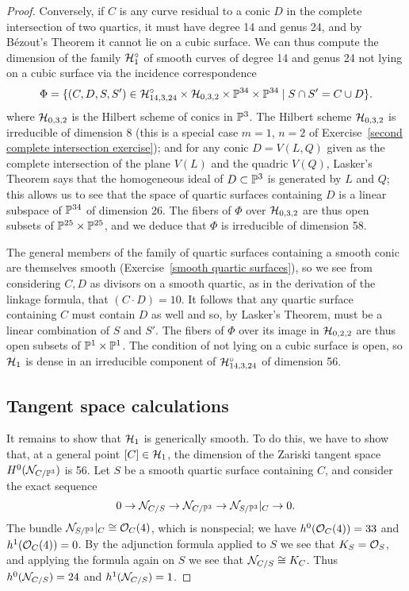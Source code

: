 \begin{proof}
Conversely, if $C$ is any curve residual to a conic $D$ in the complete intersection of two quartics, it must have degree 14 and genus 24, and by B\'ezout's Theorem it cannot lie on a cubic surface. We can thus compute the dimension of the family $\cH^\circ_1$ of smooth curves of degree 14 and genus 24 not lying on a cubic surface via the incidence correspondence
$$
\Phi = \{ (C, D, S, S') \in \cH^\circ_{14,3,24} \times \cH_{0,3,2} \times \PP^{34} \times \PP^{34} \mid S \cap S' = C \cup D\}.
$$
where $ \cH_{0,3,2}$ is the Hilbert scheme of conics in $\PP^3$. The Hilbert scheme $\cH_{0,3,2}$ is irreducible of dimension 8 (this is a special case $m=1$, $n=2$ of Exercise~\ref{second complete intersection exercise}); and for any conic $D = V(L,Q)$ given as the complete intersection of the plane $V(L)$ and the quadric $V(Q)$, Lasker's Theorem says that the homogeneous ideal of $D \subset \PP^3$ is generated by $L$ and $Q$; this allows us to see that  the space of quartic surfaces containing $D$ is a linear subspace of $\PP^{34}$ of dimension 26. The fibers of $\Phi$ over $\cH_{0,3,2}$ are thus open subsets of $\PP^{25} \times \PP^{25}$, and we deduce that $\Phi$ is irreducible of dimension 58. 

The general members of the family of quartic surfaces containing a smooth conic are themselves smooth (Exercise~\ref{smooth quartic surfaces}), so we see from considering $C,D$ as divisors on a smooth quartic, as in the derivation of the linkage formula, that $(C\cdot D) = 10$. It follows that any quartic surface containing $C$ must contain $D$ as well and so, by Lasker's Theorem, must be a linear combination of $S$ and $S'$.   The fibers of $\Phi$ over its image in $\cH_{0,2,2}$ are thus open subsets of $\PP^1 \times \PP^1$. 
The condition of not lying on a cubic surface is open, so $\cH_1$  is dense in an irreducible component of $\cH^\circ_{14,3,24}$ of dimension 56.

\subsection{Tangent space calculations}

It remains to show that $\cH_1$ is generically smooth. To do this, we have to show that,
at a general point $[C] \in \cH_{1}$, the dimension of the Zariski tangent space $H^0(\cN_{C/\PP^3})$  is 56. 
Let $S$ be a smooth quartic surface containing $C$, and consider the exact sequence 
\begin{equation}\label{normal bundle sequence}
 0 \to \cN_{C/S} \to \cN_{C/\PP^3} \to \cN_{S/\PP^3}|_C \to 0.
\end{equation}
The bundle $\cN_{S/\PP^3}|_C \cong \cO_C(4)$, which is nonspecial; we have $h^0(\cO_C(4)) = 33$ and $h^1(\cO_C(4)) = 0$. By the adjunction formula applied to $S$ we see that $K_S = \cO_S$, and applying the formula again on $S$ we see that $\cN_{C/S} \cong K_C$. Thus $h^0(\cN_{C/S}) = 24$ and $h^1(\cN_{C/S}) = 1$.


\end{proof}
